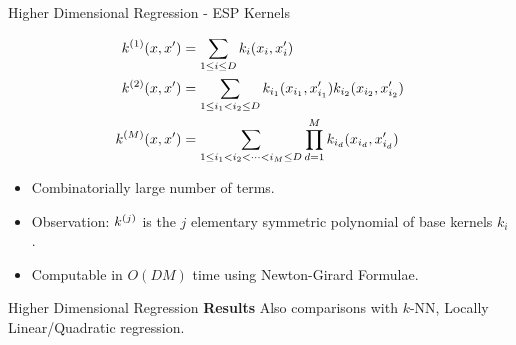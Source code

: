 \begin{frame}{Higher Dimensional Regression - ESP Kernels}

\begin{align*}
k^{(1)}(x,x') &= \sum_{1\leq i \leq D} k_i(x_i, x'_i) \\
k^{(2)}(x,x') &= \sum_{1\leq i_1 < i_2 \leq D} 
k_{i_1}(x_{i_1},x'_{i_1})  k_{i_2}(x_{i_2},x'_{i_2})\\
k^{(M)}(x,x') &= \sum_{1\leq i_1 < i_2 < \dots < i_M \leq D} 
  \prod_{d=1}^M k_{i_d}(x_{i_d}, x'_{i_d}) 
\end{align*}
\pause
\vspace{0.1in}
\begin{itemize}
\item Combinatorially large number of terms.
\item Observation: $k^{(j)}$ is the $j$ elementary symmetric
polynomial of base kernels $k_i$.
\item Computable in $O(DM)$ time using Newton-Girard Formulae.
\end{itemize}
 
\end{frame}


\begin{frame}{Higher Dimensional Regression}
\textbf{Results}
\vspace{0.1in}
\insertTableRealDataPres 
\vspace{0.2in}
Also comparisons with $k$-NN, Locally Linear/Quadratic
regression.
\end{frame}


% 
